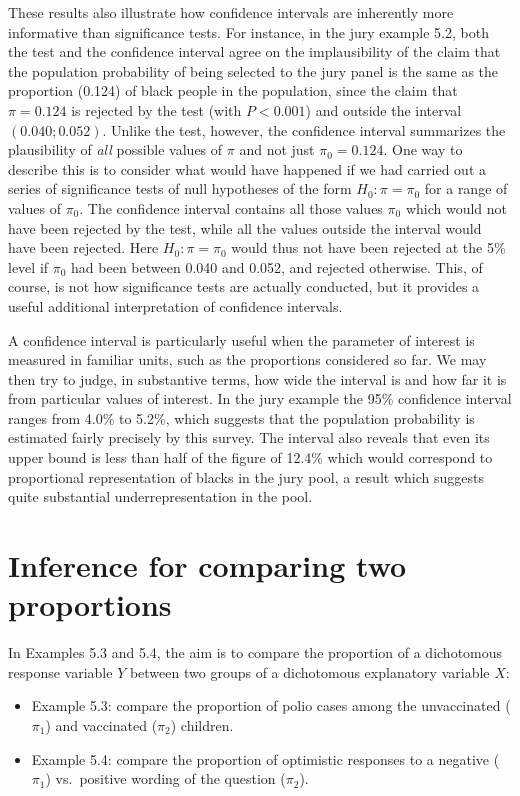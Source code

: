 \documentclass[11pt,a4paper,openany]{book}
\begin{document}
These results also illustrate how confidence intervals are inherently
more informative than significance tests. For instance, in the jury
example 5.2, both the test and the confidence interval agree on the
implausibility of the claim that the population probability of being
selected to the jury panel is the same as the proportion (0.124) of
black people in the population, since the claim that \(\pi=0.124\) is
rejected by the test (with \(P<0.001\)) and outside the interval
\((0.040; 0.052)\). Unlike the test, however, the confidence interval
summarizes the plausibility of \emph{all} possible values of \(\pi\) and
not just \(\pi_{0}=0.124\). One way to describe this is to consider what
would have happened if we had carried out a series of significance tests
of null hypotheses of the form \(H_{0}: \pi=\pi_{0}\) for a range of
values of \(\pi_{0}\). The confidence interval contains all those values
\(\pi_{0}\) which would not have been rejected by the test, while all
the values outside the interval would have been rejected. Here
\(H_{0}: \pi=\pi_{0}\) would thus not have been rejected at the 5\%
level if \(\pi_{0}\) had been between 0.040 and 0.052, and rejected
otherwise. This, of course, is not how significance tests are actually
conducted, but it provides a useful additional interpretation of
confidence intervals.

A confidence interval is particularly useful when the parameter of
interest is measured in familiar units, such as the proportions
considered so far. We may then try to judge, in substantive terms, how
wide the interval is and how far it is from particular values of
interest. In the jury example the 95\% confidence interval ranges from
4.0\% to 5.2\%, which suggests that the population probability is
estimated fairly precisely by this survey. The interval also reveals
that even its upper bound is less than half of the figure of 12.4\%
which would correspond to proportional representation of blacks in the
jury pool, a result which suggests quite substantial underrepresentation
in the pool.

\section{Inference for comparing two
proportions}\label{s-probs-2samples}

In Examples 5.3 and 5.4, the aim is to compare the proportion of a
dichotomous response variable \(Y\) between two groups of a dichotomous
explanatory variable \(X\):

\begin{itemize}
\item
  Example 5.3: compare the proportion of polio cases among the
  unvaccinated (\(\pi_{1}\)) and vaccinated (\(\pi_{2}\)) children.
\item
  Example 5.4: compare the proportion of optimistic responses to a
  negative (\(\pi_{1}\)) vs.~positive wording of the question
  (\(\pi_{2}\)).
\end{itemize}
\end{document}
